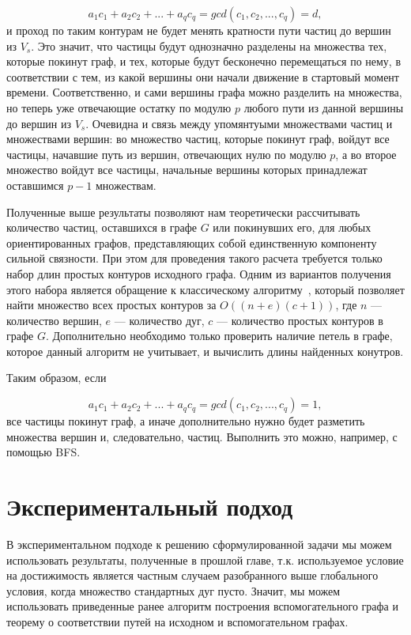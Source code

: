 	\begin{equation*}
	a_1c_1 + a_2c_2 + ... + a_qc_q = gcd(c_1, c_2, ... , c_q) = d,
	\end{equation*}	и проход по таким контурам не будет менять кратности пути частиц до вершин из $V_s$. Это значит, что частицы будут однозначно разделены на множества тех, которые покинут граф, и тех, которые будут бесконечно перемещаться по нему, в соответствии с тем, из какой вершины они начали движение в стартовый момент времени. Соответственно, и сами вершины графа можно разделить на множества, но теперь уже отвечающие остатку по модулю $p$ любого пути из данной вершины до вершин из $V_s$. Очевидна и связь между упомянтуыми множествами частиц и множествами вершин: во множество частиц, которые покинут граф, войдут все частицы, начавшие путь из вершин, отвечающих нулю по модулю $p$, а во второе множество войдут все частицы, начальные вершины которых принадлежат оставшимся $p - 1$ множествам. 
	
	Полученные выше результаты позволяют нам теоретически рассчитывать количество частиц, оставшихся в графе $G$ или покинувших его, для любых ориентированных графов, представляющих собой единственную компоненту сильной связности. При этом для проведения такого расчета требуется только набор длин простых контуров исходного графа. Одним из вариантов получения этого набора является обращение к классическому алгоритму~\autocite{Cir}, который позволяет найти множество всех простых контуров за $O((n + e)(c + 1))$, где $n$ --- количество вершин, $e$ --- количество дуг, $c$ --- количество простых контуров в графе $G$. Дополнительно необходимо только проверить наличие петель в графе, которое данный алгоритм не учитывает, и вычислить длины найденных конутров. 
	
	Таким образом, если 
	
	\begin{equation*}
	a_1c_1 + a_2c_2 + ... + a_qc_q = gcd(c_1, c_2, ... , c_q) = 1,
	\end{equation*}	все частицы покинут граф, а иначе дополнительно нужно будет разметить множества вершин и, следовательно, частиц. Выполнить это можно, например, с помощью BFS.
	
	\section{Экспериментальный подход}
	
	В экспериментальном подходе к решению сформулированной задачи мы можем использовать результаты, полученные в прошлой главе, т.к. используемое условие на достижимость является частным случаем разобранного выше глобального условия, когда множество стандартных дуг пусто. Значит, мы можем использовать приведенные ранее алгоритм построения вспомогательного графа и теорему о соответствии путей на исходном и вспомогательном графах.  
	
